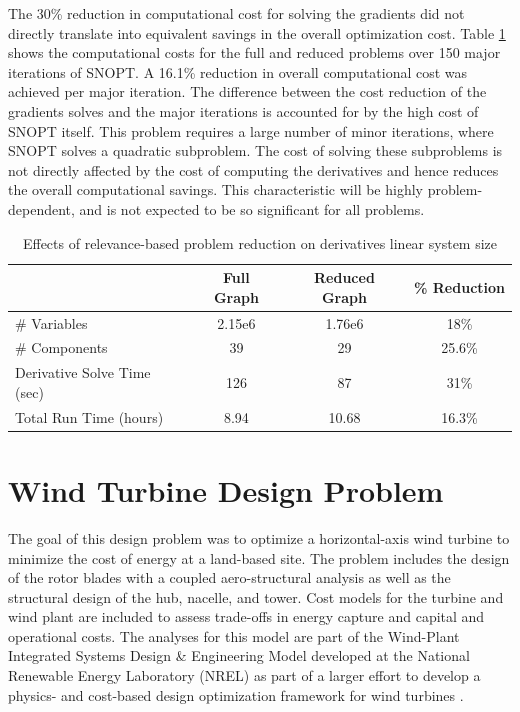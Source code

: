 \documentclass[]{aiaa-tc} %
\begin{document}
            The 30\% reduction in computational cost for solving the gradients did not directly translate into 
            equivalent savings in the overall optimization cost. Table \ref{tab:cadre-relevance-reduction}
            shows the computational costs for the full and reduced problems over 150 major iterations of SNOPT. 
            A 16.1\% reduction in overall computational cost was achieved per major iteration. The difference between 
            the cost reduction of the gradients solves and the major iterations is accounted for by the high cost of 
            SNOPT itself. This problem requires a large number of minor iterations, where SNOPT solves a quadratic subproblem. 
            The cost of solving these subproblems is not directly affected by the cost of computing the derivatives and hence
            reduces the overall computational savings. This characteristic will be highly problem-dependent, and is not expected 
            to be so significant for all problems. 

            \begin{table}
                \centering
                \caption{Effects of relevance-based problem reduction on derivatives linear system size}
                  \begin{tabular}{l c c c}
                      \toprule
                                   & Full Graph & Reduced Graph & \% Reduction\\
                      \midrule
                      \# Variables  & 2.15e6 & 1.76e6 & 18\%\\ 
                      \# Components & 39 & 29 & 25.6\%\\ 
                      Derivative Solve Time (sec) & 126 & 87 & 31\%\\ 
                      Total Run Time (hours) & 8.94 & 10.68 & 16.3\%\\ 
                      \bottomrule
                  \end{tabular}    
                \label{tab:cadre-relevance-reduction}
            \end{table}

           


  \section{Wind Turbine Design Problem}

    The goal of this design problem was to optimize a horizontal-axis wind turbine to minimize 
    the cost of energy at a land-based site. The problem includes the design of the rotor blades 
    with a coupled aero-structural analysis as well as the structural design of the hub, nacelle, 
    and tower.  Cost models for the turbine and wind plant are included 
    to assess trade-offs in energy capture and capital and operational costs.  The analyses 
    for this model are part of the Wind-Plant Integrated Systems Design \& Engineering Model 
    developed at the National Renewable Energy Laboratory (NREL) as part of a larger effort 
    to develop a physics- and cost-based design optimization framework for wind turbines  \cite{Dykes2014a,Ning2013a,Ning2014,Ning2014d}.
\end{document}
